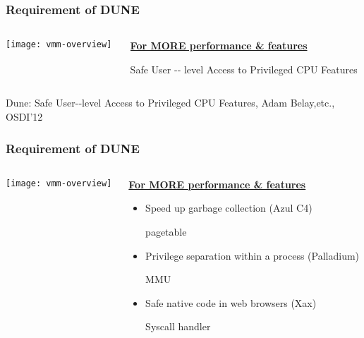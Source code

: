\begin{frame}[plain]
	\frametitle{Requirement of DUNE}
	
	
	
	\begin{columns}
		
		\begin{column}{.4\textwidth}
			
			\texttt{[image: vmm-overview]}
			
		\end{column}
		
		\begin{column}{.7\textwidth}
			
			\LARGE
			\underline{\textbf{For MORE performance \& features}}
			
			\large
			Safe	
 User -‐ level	
 Access	
 to Privileged	
 CPU	
 Features			
			
		\end{column}
		
		
	\end{columns}
	\tiny Dune:	
 Safe	
 User-­‐level	
 Access
 to 	Privileged	
 CPU	
 Features, Adam 
 Belay,etc.,	OSDI'12

\end{frame}


\begin{frame}[plain]
	\frametitle{Requirement of DUNE}
	
	
	
	\begin{columns}
		
		\begin{column}{.4\textwidth}
			
			\texttt{[image: vmm-overview]}
			
		\end{column}
		
		\begin{column}{.6\textwidth}
			
			\Large
			\underline{\textbf{For MORE performance \& features}}
		\small	
		\begin{itemize}
	\item Speed	 up	 garbage	 collection	 (Azul	 C4)	
	
	pagetable
    \item Privilege separation	 within	 a	 process	 (Palladium)
    
    MMU	
	\item Safe	 native code	 in	 web	 browsers	 (Xax) 
	
	Syscall handler
	
\end{itemize}		
			
		\end{column}
		
		
	\end{columns}

	
\end{frame}



